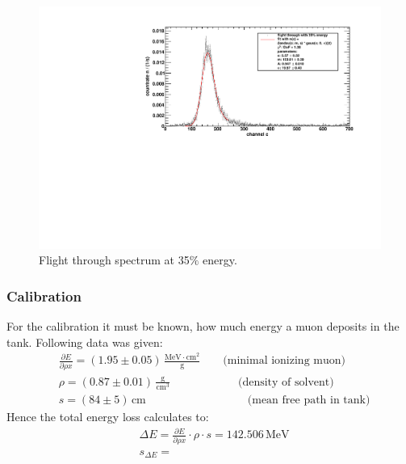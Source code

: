\begin{figure}[H]
\begin{center}
  \includegraphics[width=\textwidth]{../img/energiekalibration_35.pdf}
  \caption{Flight through spectrum at 35$\%$ energy.}
  \label{img:label}
\end{center}
\end{figure}

\subsubsection{Calibration}
For the calibration it must be known, how much energy a muon deposits in the tank. Following data was given:
\begin{equation}
    \begin{split}
        & \frac{\partial E}{\partial \rho x} = (1.95 \pm 0.05)\,\frac{\text{MeV}\cdot\text{cm}^2}{\text{g}} \qquad \text{(minimal ionizing muon)}  \\
        & \rho = (0.87 \pm 0.01) \, \frac{\text{g}}{\text{cm}^3}  \qquad \qquad \qquad \text{(density of solvent)} \\
        & s = (84 \pm 5) \, \text{cm} \qquad \qquad \qquad \qquad \quad  \text{(mean free path in tank)}
    \end{split}
\end{equation}
Hence the total energy loss calculates to:
\begin{equation}
    \begin{split}
        & \Delta E = \frac{\partial E}{\partial \rho x} \cdot \rho \cdot s = 142.506\,\text{MeV} \\
        & s_{\Delta E} = 
    \end{split}
\end{equation}

